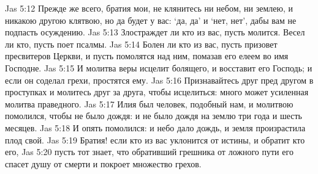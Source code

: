 Jas 5:12  Прежде же всего, братия мои, не клянитесь ни небом, ни землею, и никакою другою клятвою, но да будет у вас: `да, да' и `нет, нет', дабы вам не подпасть осуждению.
Jas 5:13  Злостраждет ли кто из вас, пусть молится. Весел ли кто, пусть поет псалмы.
Jas 5:14  Болен ли кто из вас, пусть призовет пресвитеров Церкви, и пусть помолятся над ним, помазав его елеем во имя Господне.
Jas 5:15  И молитва веры исцелит болящего, и восставит его Господь; и если он соделал грехи, простятся ему.
Jas 5:16  Признавайтесь друг пред другом в проступках и молитесь друг за друга, чтобы исцелиться: много может усиленная молитва праведного.
Jas 5:17  Илия был человек, подобный нам, и молитвою помолился, чтобы не было дождя: и не было дождя на землю три года и шесть месяцев.
Jas 5:18  И опять помолился: и небо дало дождь, и земля произрастила плод свой.
Jas 5:19  Братия! если кто из вас уклонится от истины, и обратит кто его,
Jas 5:20  пусть тот знает, что обративший грешника от ложного пути его спасет душу от смерти и покроет множество грехов.



